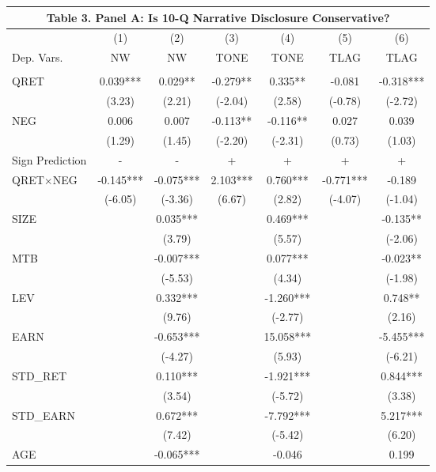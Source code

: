 \begin{table}[H]\label{T3PA}
	\centering
	\begin{tabular}{lcccccc}
		\multicolumn{7}{c}{\textbf{Table 3. Panel A: Is 10-Q Narrative Disclosure Conservative?}} \\
		\toprule
		\toprule
		& (1) & (2) & (3) & (4) & (5) & (6) \\
		Dep. Vars. & NW & NW & TONE & TONE & TLAG & TLAG \\
		\midrule
		&   &   &   &   &   &  \\
		QRET & 0.039*** & 0.029** & -0.279** & 0.335** & -0.081 & -0.318*** \\
		& (3.23) & (2.21) & (-2.04) & (2.58) & (-0.78) & (-2.72) \\
		NEG & 0.006 & 0.007 & -0.113** & -0.116** & 0.027 & 0.039 \\
		& (1.29) & (1.45) & (-2.20) & (-2.31) & (0.73) & (1.03) \\
		\rowcolor[rgb]{ .933,  .925,  .882} Sign Prediction & - & - & + & + & + & + \\
		\rowcolor[rgb]{ .933,  .925,  .882} QRET$\times$NEG & -0.145*** & -0.075*** & 2.103*** & 0.760*** & -0.771*** & -0.189 \\
		\rowcolor[rgb]{ .933,  .925,  .882}   & (-6.05) & (-3.36) & (6.67) & (2.82) & (-4.07) & (-1.04) \\
		SIZE &   & 0.035*** &   & 0.469*** &   & -0.135** \\
		&   & (3.79) &   & (5.57) &   & (-2.06) \\
		MTB &   & -0.007*** &   & 0.077*** &   & -0.023** \\
		&   & (-5.53) &   & (4.34) &   & (-1.98) \\
		LEV &   & 0.332*** &   & -1.260*** &   & 0.748** \\
		&   & (9.76) &   & (-2.77) &   & (2.16) \\
		EARN &   & -0.653*** &   & 15.058*** &   & -5.455*** \\
		&   & (-4.27) &   & (5.93) &   & (-6.21) \\
		STD\_RET &   & 0.110*** &   & -1.921*** &   & 0.844*** \\
		&   & (3.54) &   & (-5.72) &   & (3.38) \\
		STD\_EARN &   & 0.672*** &   & -7.792*** &   & 5.217*** \\
		&   & (7.42) &   & (-5.42) &   & (6.20) \\
		AGE &   & -0.065*** &   & -0.046 &   & 0.199 \\

\end{tabular}
\end{table}
